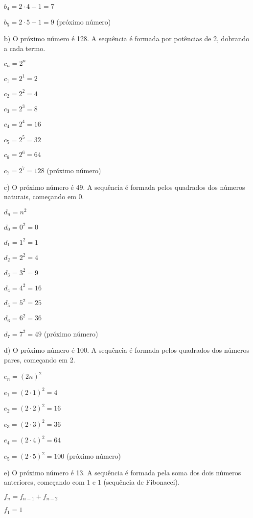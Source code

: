 \documentclass{assignment}
\begin{document}
$b_4 = 2\cdot4 - 1 = 7$

$b_5 = 2\cdot5 - 1 = 9$ (próximo número)
\newline

b) O próximo número é 128. A sequência é formada por potências de 2, dobrando a cada termo.
\newline

$c_n = 2^n$

$c_1 = 2^1 = 2$

$c_2 = 2^2 = 4$

$c_3 = 2^3 = 8$

$c_4 = 2^4 = 16$

$c_5 = 2^5 = 32$

$c_6 = 2^6 = 64$

$c_7 = 2^7 = 128$ (próximo número)
\newpage

c) O próximo número é 49. A sequência é formada pelos quadrados dos números naturais, começando em 0.
\newline

$d_n = n^2$

$d_0 = 0^2 = 0$

$d_1 = 1^2 = 1$

$d_2 = 2^2 = 4$

$d_3 = 3^2 = 9$

$d_4 = 4^2 = 16$

$d_5 = 5^2 = 25$

$d_6 = 6^2 = 36$

$d_7 = 7^2 = 49$ (próximo número)
\newline

d) O próximo número é 100. A sequência é formada pelos quadrados dos números pares, começando em 2.
\newline

$e_n = (2n)^2$

$e_1 = (2\cdot1)^2 = 4$

$e_2 = (2\cdot2)^2 = 16$

$e_3 = (2\cdot3)^2 = 36$

$e_4 = (2\cdot4)^2 = 64$

$e_5 = (2\cdot5)^2 = 100$ (próximo número)
\newline

e) O próximo número é 13. A sequência é formada pela soma dos dois números anteriores, começando com 1 e 1 (sequência de Fibonacci).
\newline

$f_n = f_{n-1} + f_{n-2}$

$f_1 = 1$
\end{document}
